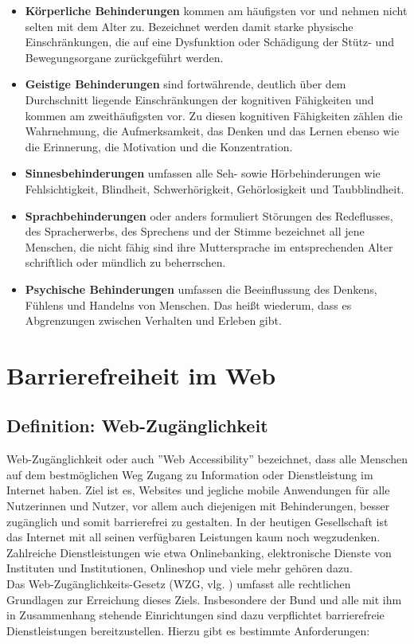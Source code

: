 \begin{itemize}
    \item \textbf{Körperliche Behinderungen} kommen am häufigsten vor und nehmen nicht selten mit dem Alter zu. Bezeichnet werden damit starke physische Einschränkungen, die auf eine Dysfunktion oder Schädigung der Stütz- und Bewegungsorgane zurückgeführt werden.
    \item \textbf{Geistige Behinderungen} sind fortwährende, deutlich über dem Durchschnitt liegende Einschränkungen der kognitiven Fähigkeiten und kommen am zweithäufigsten vor. Zu diesen kognitiven Fähigkeiten zählen die Wahrnehmung, die Aufmerksamkeit, das Denken und das Lernen ebenso wie die Erinnerung, die Motivation und die Konzentration.
    \item \textbf{Sinnesbehinderungen} umfassen alle Seh- sowie Hörbehinderungen wie Fehlsichtigkeit, Blindheit, Schwerhörigkeit, Gehörlosigkeit und Taubblindheit.
    \item \textbf{Sprachbehinderungen} oder anders formuliert Störungen des Redeflusses, des Spracherwerbs, des Sprechens und der Stimme bezeichnet all jene Menschen, die nicht fähig sind ihre Muttersprache im entsprechenden Alter schriftlich oder mündlich zu beherrschen.
    \item \textbf{Psychische Behinderungen} umfassen die Beeinflussung des Denkens, Fühlens und Handelns von Menschen. Das heißt wiederum, dass es Abgrenzungen zwischen Verhalten und Erleben gibt.
\end{itemize}

\section{Barrierefreiheit im Web}
\subsection{Definition: Web-Zugänglichkeit}
Web-Zugänglichkeit oder auch ''Web Accessibility'' bezeichnet, dass alle Menschen auf dem bestmöglichen Weg Zugang zu Information oder Dienstleistung im Internet haben. Ziel ist es, Websites und jegliche mobile Anwendungen für alle Nutzerinnen und Nutzer, vor allem auch diejenigen mit Behinderungen, besser zugänglich und somit barrierefrei zu gestalten. In der heutigen Gesellschaft ist das Internet mit all seinen verfügbaren Leistungen kaum noch wegzudenken. Zahlreiche Dienstleistungen wie etwa Onlinebanking, elektronische Dienste von Instituten und Institutionen, Onlineshop und viele mehr gehören dazu.\\
Das Web-Zugänglichkeits-Gesetz (WZG, vlg. \cite{ris_wzg_2020}) umfasst alle rechtlichen Grundlagen zur Erreichung dieses Ziels. Insbesondere der Bund und alle mit ihm in Zusammenhang stehende Einrichtungen sind dazu verpflichtet barrierefreie Dienstleistungen bereitzustellen. Hierzu gibt es bestimmte Anforderungen:

